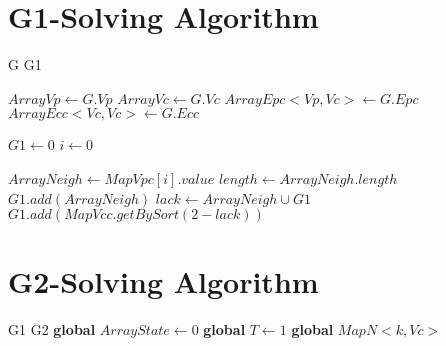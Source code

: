 \documentclass[AMA,STIX1COL]{WileyNJD-v2}
\begin{document}
\begin{appendix}  
\section{G1-Solving Algorithm}  
\begin{CJK*}{UTF8}{gkai}
    \begin{algorithm}
        \begin{algorithmic}[1] %
            \Require G
            \Ensure  G1
       
              
                \State $ArrayVp\gets G.Vp$
                \State $ArrayVc\gets G.Vc$
                \State $ArrayEpc<Vp,Vc>\gets G.Epc$   
                \State $ArrayEcc<Vc,Vc>\gets G.Ecc$ 

                \State $G1\gets 0$
                \State $i\gets 0$
                
                    \State $ArrayNeigh \gets MapVpc[i].value$
                    \State $length \gets ArrayNeigh.length$
                        \State $G1.add(ArrayNeigh)$
                    \Else   
                    	\State $lack\gets ArrayNeigh \cup G1$
                        		\State $G1.add(MapVcc.getBySort(2-lack))$
                  	\EndIf
                    \EndIf
                \EndWhile
                 \State {}
            \EndFunction
            
        \end{algorithmic}
    \end{algorithm}
\end{CJK*}
\newpage
\section{G2-Solving Algorithm}  
\begin{CJK*}{UTF8}{gkai}
    \begin{algorithm}
        \begin{algorithmic}[1] %
            \Require G1
            \Ensure G2
            \State \textbf{global} $ArrayState\gets 0$
            \State \textbf{global} $T\gets 1$
             \State \textbf{global} $MapN<k,Vc>$
              

\end{algorithmic}
\end{algorithm}
\end{CJK*}
\end{appendix}
\end{document}
